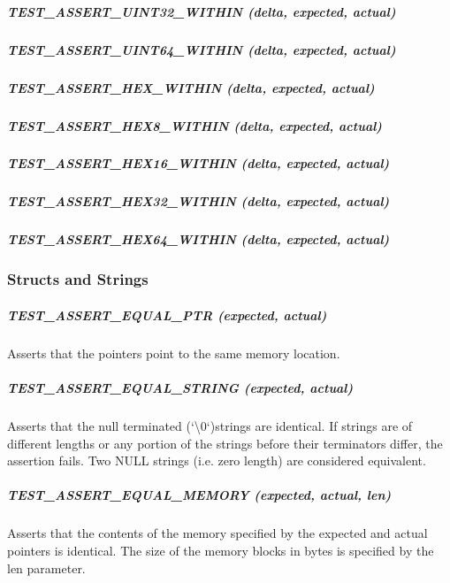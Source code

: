 \subparagraph*{{\ttfamily T\+E\+S\+T\+\_\+\+A\+S\+S\+E\+R\+T\+\_\+\+U\+I\+N\+T32\+\_\+\+W\+I\+T\+H\+IN (delta, expected, actual)}}

\subparagraph*{{\ttfamily T\+E\+S\+T\+\_\+\+A\+S\+S\+E\+R\+T\+\_\+\+U\+I\+N\+T64\+\_\+\+W\+I\+T\+H\+IN (delta, expected, actual)}}

\subparagraph*{{\ttfamily T\+E\+S\+T\+\_\+\+A\+S\+S\+E\+R\+T\+\_\+\+H\+E\+X\+\_\+\+W\+I\+T\+H\+IN (delta, expected, actual)}}

\subparagraph*{{\ttfamily T\+E\+S\+T\+\_\+\+A\+S\+S\+E\+R\+T\+\_\+\+H\+E\+X8\+\_\+\+W\+I\+T\+H\+IN (delta, expected, actual)}}

\subparagraph*{{\ttfamily T\+E\+S\+T\+\_\+\+A\+S\+S\+E\+R\+T\+\_\+\+H\+E\+X16\+\_\+\+W\+I\+T\+H\+IN (delta, expected, actual)}}

\subparagraph*{{\ttfamily T\+E\+S\+T\+\_\+\+A\+S\+S\+E\+R\+T\+\_\+\+H\+E\+X32\+\_\+\+W\+I\+T\+H\+IN (delta, expected, actual)}}

\subparagraph*{{\ttfamily T\+E\+S\+T\+\_\+\+A\+S\+S\+E\+R\+T\+\_\+\+H\+E\+X64\+\_\+\+W\+I\+T\+H\+IN (delta, expected, actual)}}

\subsubsection*{Structs and Strings}

\subparagraph*{{\ttfamily T\+E\+S\+T\+\_\+\+A\+S\+S\+E\+R\+T\+\_\+\+E\+Q\+U\+A\+L\+\_\+\+P\+TR (expected, actual)}}

Asserts that the pointers point to the same memory location.

\subparagraph*{{\ttfamily T\+E\+S\+T\+\_\+\+A\+S\+S\+E\+R\+T\+\_\+\+E\+Q\+U\+A\+L\+\_\+\+S\+T\+R\+I\+NG (expected, actual)}}

Asserts that the null terminated (`\textquotesingle{}\textbackslash{}0\textquotesingle{}`)strings are identical. If strings are of different lengths or any portion of the strings before their terminators differ, the assertion fails. Two N\+U\+LL strings (i.\+e. zero length) are considered equivalent.

\subparagraph*{{\ttfamily T\+E\+S\+T\+\_\+\+A\+S\+S\+E\+R\+T\+\_\+\+E\+Q\+U\+A\+L\+\_\+\+M\+E\+M\+O\+RY (expected, actual, len)}}

Asserts that the contents of the memory specified by the {\ttfamily expected} and {\ttfamily actual} pointers is identical. The size of the memory blocks in bytes is specified by the {\ttfamily len} parameter.

